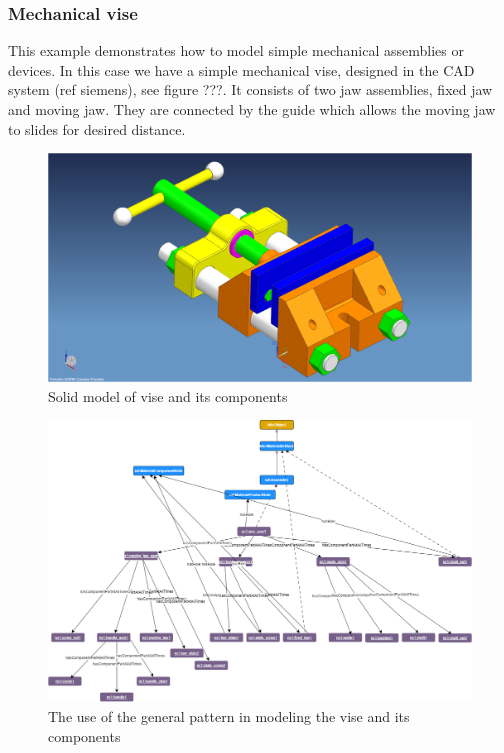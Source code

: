 \subsubsection*{Mechanical vise}
This example demonstrates how to model simple mechanical assemblies or devices. In this case we have a simple mechanical vise, designed in the CAD system (ref siemens), see figure ???. It consists of two jaw assemblies, fixed jaw and moving jaw. They are connected by the guide which allows the moving jaw to slides for desired distance.
\begin{figure}
\includegraphics[scale=0.2]{scenarios/assemblies-components/images/dau_vise_assm.png}
\caption{Solid model of vise and its components} 
\label{vise-assmebly-model}
\end{figure}
\begin{figure}
\includegraphics[scale=0.2]{scenarios/assemblies-components/images/vise-asembly-component.png}
\caption{The use of the general pattern in modeling the vise and its components} 
\label{vise-assmebly-components}
\end{figure}






